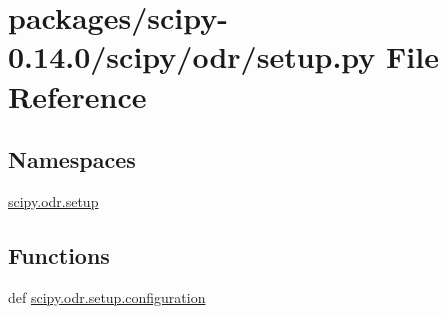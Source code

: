 \hypertarget{packages_2scipy-0_814_80_2scipy_2odr_2setup_8py}{}\section{packages/scipy-\/0.14.0/scipy/odr/setup.py File Reference}
\label{packages_2scipy-0_814_80_2scipy_2odr_2setup_8py}
\subsection*{Namespaces}
\begin{DoxyCompactItemize}
\item 
 \hyperlink{namespacescipy_1_1odr_1_1setup}{scipy.\+odr.\+setup}
\end{DoxyCompactItemize}
\subsection*{Functions}
\begin{DoxyCompactItemize}
\item 
def \hyperlink{namespacescipy_1_1odr_1_1setup_a7ab5d7a4640edba0ed55864c504b6ec8}{scipy.\+odr.\+setup.\+configuration}
\end{DoxyCompactItemize}

